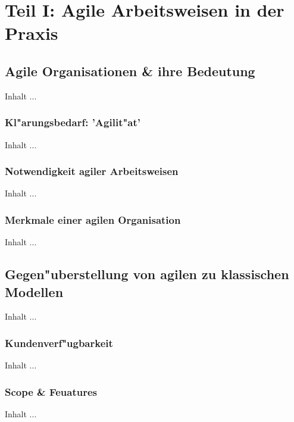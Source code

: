 
\chapter{Teil I: Agile Arbeitsweisen in der Praxis}
\minitoc 
\vspace{1 cm} 



\section{Agile Organisationen \& ihre Bedeutung}
Inhalt ...

\subsection{Kl"arungsbedarf: 'Agilit"at'}
Inhalt ...

\subsection{Notwendigkeit agiler Arbeitsweisen}
Inhalt ...

\subsection{Merkmale einer agilen Organisation}
Inhalt ...



\section{Gegen"uberstellung von agilen zu klassischen Modellen}
Inhalt ...

\subsection{Kundenverf"ugbarkeit}
Inhalt ...


\subsection{Scope \& Feuatures}
Inhalt ...

